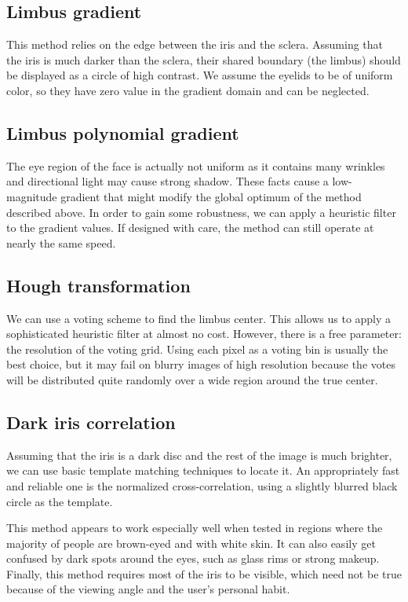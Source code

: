 \subsection{Limbus gradient}
This method relies on the edge between the iris and the sclera.
Assuming that the iris is much darker than the sclera, their shared boundary (the limbus) should be displayed as a circle of high contrast.
We assume the eyelids to be of uniform color, so they have zero value in the gradient domain and can be neglected.

\subsection{Limbus polynomial gradient}
The eye region of the face is actually not uniform as it contains many wrinkles and directional light may cause strong shadow.
These facts cause a low-magnitude gradient that might modify the global optimum of the method described above.
In order to gain some robustness, we can apply a heuristic filter to the gradient values.
If designed with care, the method can still operate at nearly the same speed.

\subsection{Hough transformation}
We can use a voting scheme to find the limbus center.
This allows us to apply a sophisticated heuristic filter at almost no cost.
However, there is a free parameter: the resolution of the voting grid.
Using each pixel as a voting bin is usually the best choice, but it may fail on blurry images of high resolution because the votes will be distributed quite randomly over a wide region around the true center.

\subsection{Dark iris correlation}
Assuming that the iris is a dark disc and the rest of the image is much brighter, we can use basic template matching techniques to locate it.
An appropriately fast and reliable one is the normalized cross-correlation, using a slightly blurred black circle as the template.

This method appears to work especially well when tested in regions where the majority of people are brown-eyed and with white skin.
It can also easily get confused by dark spots around the eyes, such as glass rims or strong makeup.
Finally, this method requires most of the iris to be visible, which need not be true because of the viewing angle and the user's personal habit.

